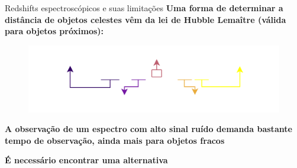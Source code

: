 \begin{frame}[c]{Redshifts espectroscópicos e suas limitações}
    \textbf{Uma forma de determinar a distância de objetos celestes vêm da lei de Hubble Lemaître (válida para objetos próximos):}
    \vspace*{-0.5cm}
    \begin{figure}
        \centering
        \includegraphics[width=0.8\linewidth]{script/images/hubble_law.png}
    \end{figure}
    \vspace*{-0.5cm}
    \begin{splusbox}{}
        \centering
        \textbf{A observação de um espectro com alto sinal ruído demanda bastante tempo de observação, ainda mais para objetos fracos}

        \vspace{0.3cm}
        \textbf{É necessário encontrar uma alternativa}
    \end{splusbox}
\end{frame}

